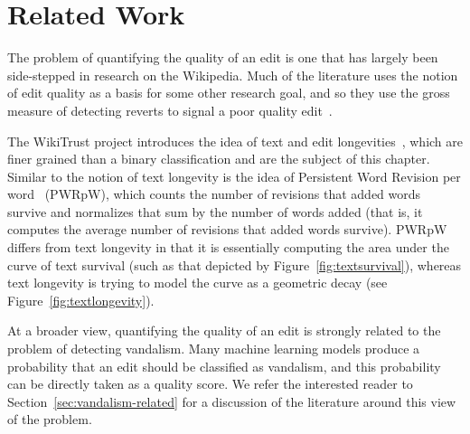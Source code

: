 \section{Related Work}

The problem of quantifying the quality of an edit is one that has
largely been side-stepped in research on the Wikipedia.
Much of the literature uses the notion of edit quality as a basis
for some other research goal, and so they use the gross measure
of detecting reverts to signal a poor quality
edit~\cite{Adler2007,Smets2008,Itakura2009,Belani2010}.

The WikiTrust project introduces the idea of text and edit
longevities~\cite{Adler2007}, which are finer grained than a
binary classification and are the subject of this chapter.
Similar to the notion of text longevity is the idea
of Persistent Word Revision per
word~\cite{Halfaker2009,Halfaker2011} (PWRpW),
which counts the number of revisions that added words survive
and normalizes that sum by the number of words added (that is,
it computes the average number of revisions that added words survive).
PWRpW differs from text longevity in that it is essentially computing
the area under the curve of text survival (such as that depicted by
Figure~\ref{fig:textsurvival}),
whereas text longevity is trying to model the curve as a
geometric decay (see Figure~\ref{fig:textlongevity}).

At a broader view, quantifying the quality of an edit is strongly
related to the problem of detecting vandalism.
Many machine learning models produce a probability that an edit
should be classified as vandalism, and this probability can be
directly taken as a quality score.
We refer the interested reader to Section~\ref{sec:vandalism-related}
for a discussion of the literature around this view of the problem.

